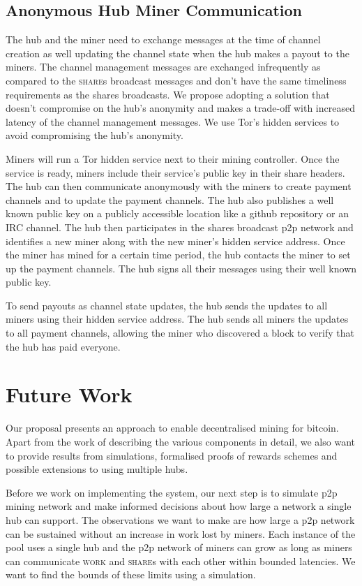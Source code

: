 \documentclass{article}
\begin{document}
\subsection{Anonymous Hub Miner
  Communication}\label{sec:hub-miner-communication}

The hub and the miner need to exchange messages at the time of channel
creation as well updating the channel state when the hub makes a
payout to the miners. The channel management messages are exchanged
infrequently as compared to the \textsc{share}s broadcast messages and
don't have the same timeliness requirements as the shares
broadcasts. We propose adopting a solution that doesn't compromise on
the hub's anonymity and makes a trade-off with increased latency of
the channel management messages. We use Tor's hidden services to avoid
compromising the hub's anonymity.

Miners will run a Tor hidden service next to their mining
controller. Once the service is ready, miners include their service's
public key in their share headers. The hub can then communicate
anonymously with the miners to create payment channels and to update
the payment channels. The hub also publishes a well known public key
on a publicly accessible location like a github repository or an IRC
channel. The hub then participates in the shares broadcast p2p network
and identifies a new miner along with the new miner's hidden service
address. Once the miner has mined for a certain time period, the hub
contacts the miner to set up the payment channels. The hub signs all
their messages using their well known public key.

To send payouts as channel state updates, the hub sends the updates to
all miners using their hidden service address. The hub sends all
miners the updates to all payment channels, allowing the miner who
discovered a block to verify that the hub has paid everyone.

\section{Future Work}

Our proposal presents an approach to enable decentralised mining for
bitcoin. Apart from the work of describing the various components in
detail, we also want to provide results from simulations, formalised
proofs of rewards schemes and possible extensions to using multiple
hubs.

Before we work on implementing the system, our next step is to
simulate p2p mining network and make informed decisions about how
large a network a single hub can support. The observations we want to
make are how large a p2p network can be sustained without an increase
in work lost by miners. Each instance of the pool uses a single hub
and the p2p network of miners can grow as long as miners can
communicate \textsc{work} and \textsc{share}s with each other within
bounded latencies. We want to find the bounds of these limits using a
simulation.
\end{document}
